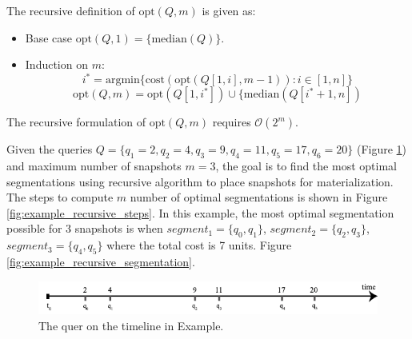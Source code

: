 			The recursive definition of $\mathrm{opt}(Q, m)$ is given as:

			\begin{itemize}
				\item Base case $ \mathrm{opt}(Q, 1) = \{\mathrm{median}(Q)\}$.
				\item Induction on $m$:
				$$i^* = \mathrm{argmin}\{\mathrm{cost}(\mathrm{opt}(Q[1,i], m-1)): i\in[1,
				n]\}$$
				$$
				\mathrm{opt}(Q, m) = \mathrm{opt}(Q[1, i^*]) \cup \{\mathrm{median}(Q[i^*+1, n])
				$$
			\end{itemize}
			The recursive formulation of $\mathrm{opt}(Q, m)$ requires $\mathcal{O}(2^{m})$.

			\begin{example}
				Given the queries $Q=\{q_1=2,q_2=4,q_3=9,q_4=11,q_5=17,q_6=20\}$ (Figure \ref{fig:example_recursive_queries}) and maximum number of snapshots $m=3$, the goal is to find the most optimal segmentations using recursive algorithm to place snapshots for materialization. The steps to compute $m$ number of optimal segmentations is shown in Figure \ref{fig:example_recursive_steps}. In this example, the most optimal segmentation possible for 3 snapshots is when $segment_1 = \{q_0,q_1\}$, $segment_2 = \{q_2,q_3\}$, $segment_3= \{q_4,q_5\}$ where the total cost is 7 units. Figure \ref{fig:example_recursive_segmentation}.
			\label{example:recursive_segmantation}
			\end{example}

			\begin{figure}[b]
				\centering
				\includegraphics[width=\textwidth]{figs/example_recursive_q.pdf}
				\caption{The quer on the timeline in Example.}
				\label{fig:example_recursive_queries}
			\end{figure}

